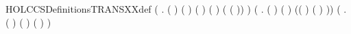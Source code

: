\begin{SaveVerbatim}{HOLCCSDefinitionsTRANSXXdef}
                 (\HOLSymConst{\HOLTokenExists{}}    .
                      ( \HOLSymConst{=}  \HOLSymConst{\ensuremath{\parallel}} ) \HOLSymConst{\HOLTokenConj{}} ( \HOLSymConst{=} \HOLConst{\ensuremath{\tau}}) \HOLSymConst{\HOLTokenConj{}}
                      ( \HOLSymConst{=}  \HOLSymConst{\ensuremath{\parallel}} ) \HOLSymConst{\HOLTokenConj{}}   ( )  \HOLSymConst{\HOLTokenConj{}}
                        ( ( )) ) \HOLSymConst{\HOLTokenDisj{}}
                 (\HOLSymConst{\HOLTokenExists{}}   .
                      ( \HOLSymConst{=} \HOLConst{\ensuremath{\nu}}  ) \HOLSymConst{\HOLTokenConj{}} ( \HOLSymConst{=} \HOLConst{\ensuremath{\nu}}  ) \HOLSymConst{\HOLTokenConj{}}
                          \HOLSymConst{\HOLTokenConj{}}
                      (( \HOLSymConst{=} \HOLConst{\ensuremath{\tau}}) \HOLSymConst{\HOLTokenDisj{}}
                       ( \HOLSymConst{=}  ) \HOLSymConst{\HOLTokenConj{}}  \HOLConst{\HOLTokenNotIn{}}  \HOLSymConst{\HOLTokenConj{}}   \HOLConst{\HOLTokenNotIn{}} )) \HOLSymConst{\HOLTokenDisj{}}
                 (\HOLSymConst{\HOLTokenExists{}}   .
                      ( \HOLSymConst{=}   ) \HOLSymConst{\HOLTokenConj{}} ( \HOLSymConst{=}   ) \HOLSymConst{\HOLTokenConj{}}
                      ( \HOLSymConst{=}   ) \HOLSymConst{\HOLTokenConj{}}    ) \HOLSymConst{\HOLTokenDisj{}}

\end{SaveVerbatim}

